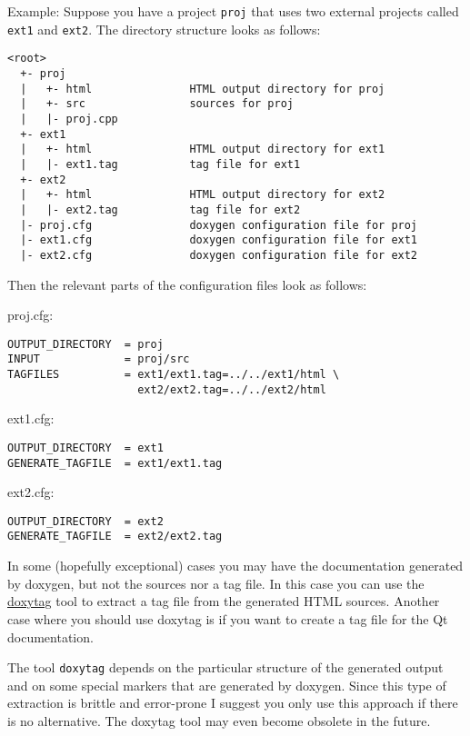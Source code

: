 \begin{Desc}
\item[Example: ]Suppose you have a project {\tt proj} that uses two external projects called {\tt ext1} and {\tt ext2}. The directory structure looks as follows:\end{Desc}
\begin{Desc}
\item[]

\footnotesize\begin{verbatim}
<root>
  +- proj
  |   +- html               HTML output directory for proj
  |   +- src                sources for proj
  |   |- proj.cpp
  +- ext1
  |   +- html               HTML output directory for ext1
  |   |- ext1.tag           tag file for ext1
  +- ext2
  |   +- html               HTML output directory for ext2
  |   |- ext2.tag           tag file for ext2
  |- proj.cfg               doxygen configuration file for proj
  |- ext1.cfg               doxygen configuration file for ext1
  |- ext2.cfg               doxygen configuration file for ext2
\end{verbatim}
\normalsize
\end{Desc}
\begin{Desc}
\item[]Then the relevant parts of the configuration files look as follows: \end{Desc}
\begin{Desc}
\item[]proj.cfg: 

\footnotesize\begin{verbatim}
OUTPUT_DIRECTORY  = proj
INPUT             = proj/src
TAGFILES          = ext1/ext1.tag=../../ext1/html \
                    ext2/ext2.tag=../../ext2/html 
\end{verbatim}
\normalsize
 ext1.cfg: 

\footnotesize\begin{verbatim}
OUTPUT_DIRECTORY  = ext1
GENERATE_TAGFILE  = ext1/ext1.tag 
\end{verbatim}
\normalsize
 ext2.cfg: 

\footnotesize\begin{verbatim}
OUTPUT_DIRECTORY  = ext2
GENERATE_TAGFILE  = ext2/ext2.tag
\end{verbatim}
\normalsize
\end{Desc}
In some (hopefully exceptional) cases you may have the documentation generated by doxygen, but not the sources nor a tag file. In this case you can use the \hyperlink{doxytag_usage}{doxytag} tool to extract a tag file from the generated HTML sources. Another case where you should use doxytag is if you want to create a tag file for the Qt documentation.

The tool {\tt doxytag} depends on the particular structure of the generated output and on some special markers that are generated by doxygen. Since this type of extraction is brittle and error-prone I suggest you only use this approach if there is no alternative. The doxytag tool may even become obsolete in the future.

 